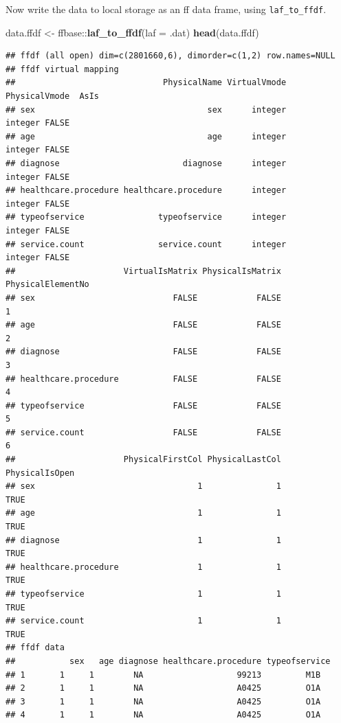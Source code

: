 \documentclass[]{book}
\newenvironment{Shaded}{\begin{snugshade}}{\end{snugshade}}
\newcommand{\KeywordTok}[1]{\textcolor[rgb]{0.13,0.29,0.53}{\textbf{{#1}}}}
\newcommand{\DataTypeTok}[1]{\textcolor[rgb]{0.13,0.29,0.53}{{#1}}}
\newcommand{\StringTok}[1]{\textcolor[rgb]{0.31,0.60,0.02}{{#1}}}
\newcommand{\NormalTok}[1]{{#1}}
\theoremstyle{definition}
\theoremstyle{definition}
\theoremstyle{remark}
\begin{document}
Now write the data to local storage as an ff data frame, using
\texttt{laf\_to\_ffdf}.

\begin{Shaded}
\begin{Highlighting}[]
\NormalTok{data.ffdf <-}\StringTok{ }\NormalTok{ffbase::}\KeywordTok{laf_to_ffdf}\NormalTok{(}\DataTypeTok{laf =} \NormalTok{.dat)}
\KeywordTok{head}\NormalTok{(data.ffdf)}
\end{Highlighting}
\end{Shaded}

\begin{verbatim}
## ffdf (all open) dim=c(2801660,6), dimorder=c(1,2) row.names=NULL
## ffdf virtual mapping
##                              PhysicalName VirtualVmode PhysicalVmode  AsIs
## sex                                   sex      integer       integer FALSE
## age                                   age      integer       integer FALSE
## diagnose                         diagnose      integer       integer FALSE
## healthcare.procedure healthcare.procedure      integer       integer FALSE
## typeofservice               typeofservice      integer       integer FALSE
## service.count               service.count      integer       integer FALSE
##                      VirtualIsMatrix PhysicalIsMatrix PhysicalElementNo
## sex                            FALSE            FALSE                 1
## age                            FALSE            FALSE                 2
## diagnose                       FALSE            FALSE                 3
## healthcare.procedure           FALSE            FALSE                 4
## typeofservice                  FALSE            FALSE                 5
## service.count                  FALSE            FALSE                 6
##                      PhysicalFirstCol PhysicalLastCol PhysicalIsOpen
## sex                                 1               1           TRUE
## age                                 1               1           TRUE
## diagnose                            1               1           TRUE
## healthcare.procedure                1               1           TRUE
## typeofservice                       1               1           TRUE
## service.count                       1               1           TRUE
## ffdf data
##           sex   age diagnose healthcare.procedure typeofservice
## 1       1     1        NA                   99213         M1B  
## 2       1     1        NA                   A0425         O1A  
## 3       1     1        NA                   A0425         O1A  
## 4       1     1        NA                   A0425         O1A  

\end{verbatim}
\end{document}
